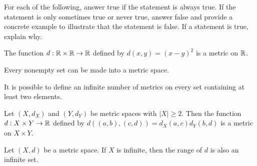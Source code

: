 {\begin{comment}
Suppose $x=y$. Then 
\[(f \circ d)(x,y) = f(d(x,x)) = f(0) = 0.\]
Conversely, suppose $(f \circ d)(x,y) = 0$. Then $f(d(x,y)) = 0$. The fact that $f(t) = 0$ if and only if $t=0$ implies that $d(x,y) = 0$. Thus, $x=y$. 

Finally, we address the triangle inequality. The result of part (a) and the fact that $f$ is increasing show that  
\begin{align*}
(f \circ d)(x,y) + (f \circ d)(y,z) &= f(d(x,y)) + f(d(y,z)) \\
	&\geq f(d(x,y)+d(y,z)) \\
	&\geq f(d(x,z) \\
	&= (f \circ d)(x,z).
\end{align*}

\ea

\end{comment}



\item For each of the following, answer true if the statement is always true. If the statement is only sometimes true or never true, answer false and provide a concrete example to illustrate that the statement is false. If a statement is true, explain why. 
	\ba
	\item The function $d: \mathbb{R} \times \mathbb{R} \to \mathbb{R}$ defined by $d(x,y) = (x-y)^2$ is a metric on $\mathbb{R}$. 

	\item Every nonempty set can be made into a metric space. 
	
	\item It is possible to define an infinite number of metrics on every set containing at least two elements.

	\item Let $(X, d_X)$ and $(Y, d_Y)$ be metric spaces with $|X| \geq 2$. Then the function $d: X \times Y \to \mathbb{R}$ defined by $d((a,b),(c,d)) = d_X(a,c)d_Y(b,d)$ is a metric on $X \times Y$.
	
	\item Let $(X,d)$ be a metric space. If $X$ is infinite, then the range of $d$ is also an infinite set. 

			
	\ea

\begin{comment}

\ExerciseSolution

	\ba
	
	\item This statement is false. Although $d$ satisfies $d(x,y) \geq 0$ and $d(x,y) = d(y,x)$ for all $x$, $y$ in $\R$, and $d(x,y) = 0$ if and only if $x=y$, the function $d$ fails to satisfy the triangle inequality. Note that $d(1,3) = 2^2 = 4$ but 
	\[d(1,2) + d(2,3) = 1^2+1^2 = 2 < d(1,3).\]
	

\end{comment}}
